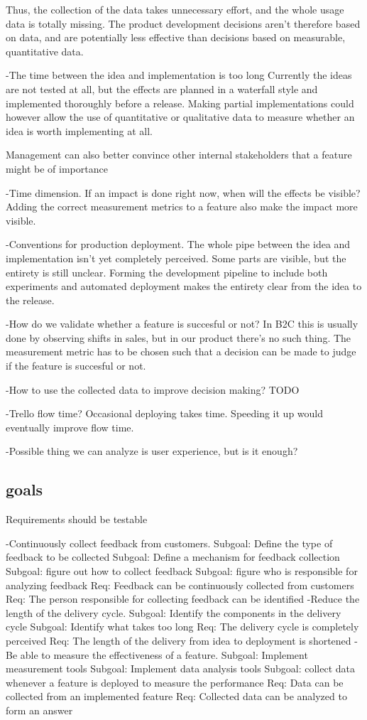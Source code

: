 \documentclass[english]{tktltiki2}
\theoremstyle{definition}
\theoremstyle{remark}
\begin{document}
  Thus, the collection of the data takes unnecessary effort, and the whole usage data is totally missing. The product development decisions aren't therefore based on data, and are potentially less effective than decisions based on measurable, quantitative data.

-The time between the idea and implementation is too long
  Currently the ideas are not tested at all, but the effects are planned in a waterfall style and implemented thoroughly before a release. Making partial implementations could however allow the use of quantitative or qualitative data to measure whether an idea is worth implementing at all.

  Management can also better convince other internal stakeholders that a feature might be of importance

-Time dimension. If an impact is done right now, when will the effects be visible?
  Adding the correct measurement metrics to a feature also make the impact more visible.

-Conventions for production deployment. The whole pipe between the idea and implementation isn't yet completely perceived. Some parts are visible, but the entirety is still unclear.
  Forming the development pipeline to include both experiments and automated deployment makes the entirety clear from the idea to the release.

-How do we validate whether a feature is succesful or not? In B2C this is usually done by observing shifts in sales, but in our product there's no such thing.
  The measurement metric has to be chosen such that a decision can be made to judge if the feature is succesful or not.

-How to use the collected data to improve decision making?
  TODO

-Trello flow time?
  Occasional deploying takes time. Speeding it up would eventually improve flow time.

-Possible thing we can analyze is user experience, but is it enough?

\subsection{goals}
Requirements should be testable

-Continuously collect feedback from customers.
    Subgoal: Define the type of feedback to be collected
    Subgoal: Define a mechanism for feedback collection
    Subgoal: figure out how to collect feedback
    Subgoal: figure who is responsible for analyzing feedback
	Req: Feedback can be continuously collected from customers
	Req: The person responsible for collecting feedback can be identified 
-Reduce the length of the delivery cycle.
	Subgoal: Identify the components in the delivery cycle
	Subgoal: Identify what takes too long
	Req: The delivery cycle is completely perceived
	Req: The length of the delivery from idea to deployment is shortened
-Be able to measure the effectiveness of a feature.
	Subgoal: Implement measurement tools
	Subgoal: Implement data analysis tools
	Subgoal: collect data whenever a feature is deployed to measure the performance	
    Req: Data can be collected from an implemented feature 
    Req: Collected data can be analyzed to form an answer
\end{document}

